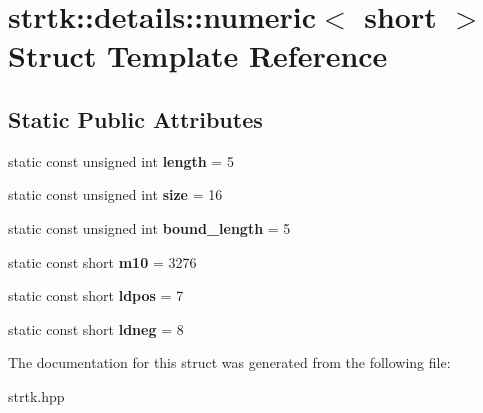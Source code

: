 \hypertarget{structstrtk_1_1details_1_1numeric_3_01short_01_4}{\section{strtk\-:\-:details\-:\-:numeric$<$ short $>$ Struct Template Reference}
\label{structstrtk_1_1details_1_1numeric_3_01short_01_4}
}
\subsection*{Static Public Attributes}
\begin{DoxyCompactItemize}
\item 
\hypertarget{structstrtk_1_1details_1_1numeric_3_01short_01_4_a58c4a9a1fa5456f26adb7dea7224d6aa}{static const unsigned int {\bfseries length} = 5}\label{structstrtk_1_1details_1_1numeric_3_01short_01_4_a58c4a9a1fa5456f26adb7dea7224d6aa}

\item 
\hypertarget{structstrtk_1_1details_1_1numeric_3_01short_01_4_a913e8c575e17be7b541d1a9cb30d9f82}{static const unsigned int {\bfseries size} = 16}\label{structstrtk_1_1details_1_1numeric_3_01short_01_4_a913e8c575e17be7b541d1a9cb30d9f82}

\item 
\hypertarget{structstrtk_1_1details_1_1numeric_3_01short_01_4_aa2d3df3b5dd630026edaa5afd423a17e}{static const unsigned int {\bfseries bound\-\_\-length} = 5}\label{structstrtk_1_1details_1_1numeric_3_01short_01_4_aa2d3df3b5dd630026edaa5afd423a17e}

\item 
\hypertarget{structstrtk_1_1details_1_1numeric_3_01short_01_4_aff79ee4973862acb084a9ba27a6c1715}{static const short {\bfseries m10} = 3276}\label{structstrtk_1_1details_1_1numeric_3_01short_01_4_aff79ee4973862acb084a9ba27a6c1715}

\item 
\hypertarget{structstrtk_1_1details_1_1numeric_3_01short_01_4_a37e041d2ddb1a35a7bf20729d9d1cef4}{static const short {\bfseries ldpos} = 7}\label{structstrtk_1_1details_1_1numeric_3_01short_01_4_a37e041d2ddb1a35a7bf20729d9d1cef4}

\item 
\hypertarget{structstrtk_1_1details_1_1numeric_3_01short_01_4_a0ffab46d5d5aeaa40967657d3e5b928e}{static const short {\bfseries ldneg} = 8}\label{structstrtk_1_1details_1_1numeric_3_01short_01_4_a0ffab46d5d5aeaa40967657d3e5b928e}

\end{DoxyCompactItemize}


The documentation for this struct was generated from the following file\-:\begin{DoxyCompactItemize}
\item 
strtk.\-hpp\end{DoxyCompactItemize}
